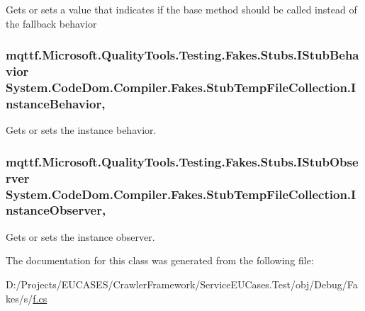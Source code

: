 Gets or sets a value that indicates if the base method should be called instead of the fallback behavior

\hypertarget{class_system_1_1_code_dom_1_1_compiler_1_1_fakes_1_1_stub_temp_file_collection_a074d36addd3122461925a5960a8697bd}{
\subsubsection[{Instance\-Behavior}]{\setlength{\rightskip}{0pt plus 5cm}mqttf.\-Microsoft.\-Quality\-Tools.\-Testing.\-Fakes.\-Stubs.\-I\-Stub\-Behavior System.\-Code\-Dom.\-Compiler.\-Fakes.\-Stub\-Temp\-File\-Collection.\-Instance\-Behavior\hspace{0.3cm}{\ttfamily [get]}, {\ttfamily [set]}}}\label{class_system_1_1_code_dom_1_1_compiler_1_1_fakes_1_1_stub_temp_file_collection_a074d36addd3122461925a5960a8697bd}


Gets or sets the instance behavior.

\hypertarget{class_system_1_1_code_dom_1_1_compiler_1_1_fakes_1_1_stub_temp_file_collection_a037bc190b6fdcc8e177c469d11feb1a5}{
\subsubsection[{Instance\-Observer}]{\setlength{\rightskip}{0pt plus 5cm}mqttf.\-Microsoft.\-Quality\-Tools.\-Testing.\-Fakes.\-Stubs.\-I\-Stub\-Observer System.\-Code\-Dom.\-Compiler.\-Fakes.\-Stub\-Temp\-File\-Collection.\-Instance\-Observer\hspace{0.3cm}{\ttfamily [get]}, {\ttfamily [set]}}}\label{class_system_1_1_code_dom_1_1_compiler_1_1_fakes_1_1_stub_temp_file_collection_a037bc190b6fdcc8e177c469d11feb1a5}


Gets or sets the instance observer.



The documentation for this class was generated from the following file\-:\begin{DoxyCompactItemize}
\item 
D\-:/\-Projects/\-E\-U\-C\-A\-S\-E\-S/\-Crawler\-Framework/\-Service\-E\-U\-Cases.\-Test/obj/\-Debug/\-Fakes/s/\hyperlink{s_2f_8cs}{f.\-cs}\end{DoxyCompactItemize}
